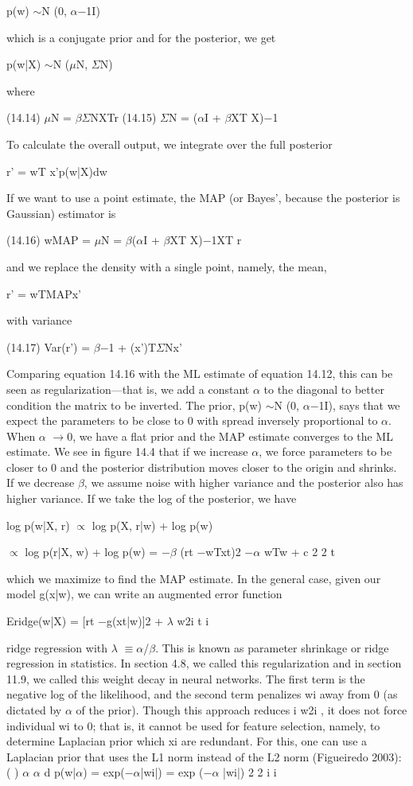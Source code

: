 p(w) $\sim$N (0, $\alpha$$-$1I)

which is a conjugate prior and for the posterior, we get

p(w|X) $\sim$N ($\mu$N, $\Sigma$N)

where

(14.14) $\mu$N = $\beta$$\Sigma$NXTr (14.15) $\Sigma$N = ($\alpha$I + $\beta$XT X)$-$1

To calculate the overall output, we integrate over the full posterior

r' = wT x'p(w|X)dw

If we want to use a point estimate, the MAP (or Bayes’, because the posterior is Gaussian) estimator is

(14.16) wMAP = $\mu$N = $\beta$($\alpha$I + $\beta$XT X)$-$1XT r

and we replace the density with a single point, namely, the mean,

r' = wTMAPx'

with variance

(14.17) Var(r') = $\beta$$-$1 + (x')T$\Sigma$Nx'

Comparing equation 14.16 with the ML estimate of equation 14.12, this can be seen as regularization---that is, we add a constant $\alpha$ to the diagonal to better condition the matrix to be inverted. The prior, p(w) $\sim$N (0, $\alpha$$-$1I), says that we expect the parameters to be close to 0 with spread inversely proportional to $\alpha$. When $\alpha$ $\to$0, we have a flat prior and the MAP estimate converges to the ML estimate. We see in figure 14.4 that if we increase $\alpha$, we force parameters to be closer to 0 and the posterior distribution moves closer to the origin and shrinks. If we decrease $\beta$, we assume noise with higher variance and the posterior also has higher variance. If we take the log of the posterior, we have

log p(w|X, r) $\propto$ log p(X, r|w) + log p(w)

$\propto$ log p(r|X, w) + log p(w) = $-$$\beta$ (rt $-$wTxt)2 $-$$\alpha$ wTw + c 2 2 t

which we maximize to find the MAP estimate. In the general case, given our model g(x|w), we can write an augmented error function

Eridge(w|X) = [rt $-$g(xt|w)]2 + $\lambda$ w2i t i

ridge regression with $\lambda$ $\equiv$$\alpha$/$\beta$. This is known as parameter shrinkage or ridge regression in statistics. In section 4.8, we called this regularization and in section 11.9, we called this weight decay in neural networks. The first term is the negative log of the likelihood, and the second term penalizes wi away from 0 (as dictated by $\alpha$ of the prior). Though this approach reduces i w2i , it does not force individual wi to 0; that is, it cannot be used for feature selection, namely, to determine Laplacian prior which xi are redundant. For this, one can use a Laplacian prior that uses the L1 norm instead of the L2 norm (Figueiredo 2003): ( ) $\alpha$ $\alpha$ d p(w|$\alpha$) = exp($-$$\alpha$|wi|) = exp ($-$$\alpha$ |wi|) 2 2 i i

